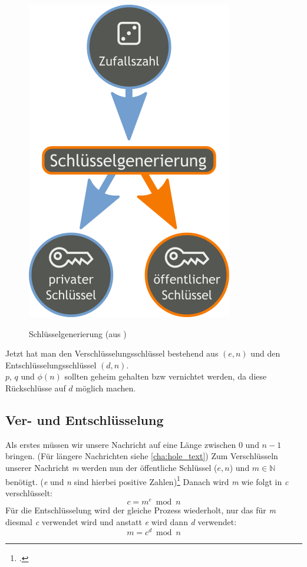 \documentclass[12pt,a4paper]{scrartcl}
\begin{document}
\begin{figure}
\includegraphics[scale=0.3]{Orange_blue_public_private_keygeneration} \\
\caption{Schlüsselgenerierung (aus \cite{wikipedia})}
\label{fig:figure1}
\end{figure}

Jetzt hat man den Verschlüsselungsschlüssel bestehend aus $(e, n)$ und den Entschlüsselungsschlüssel $(d, n)$. \\
$p$, $q$ und $\phi(n)$ sollten geheim gehalten bzw vernichtet werden, da diese Rückschlüsse auf $d$ möglich machen.
	
	\subsection{Ver- und Entschlüsselung}
	Als erstes müssen wir unsere Nachricht auf eine Länge zwischen 0 und $n-1$ bringen. (Für längere Nachrichten siehe \ref{cha:hole_text})
	Zum Verschlüsseln unserer Nachricht \textit{m} werden nun der öffentliche Schlüssel ($e, n$) und $m \in \mathbb{N}$ benötigt. (\textit{e} und \textit{n} sind hierbei positive Zahlen)\footcite[][6]{rsaOriginalPaper} Danach wird \textit{m} wie folgt in \textit{c} verschlüsselt: 
	$$c = m^e \bmod n$$
	Für die Entschlüsselung wird der gleiche Prozess wiederholt, nur das für \textit{m} diesmal \textit{c} verwendet wird und anstatt \textit{e} wird dann \textit{d} verwendet:
	$$m = c^d \bmod n$$
	
\end{document}
